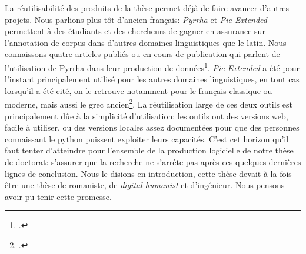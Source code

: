 La réutilisabilité des produits de la thèse permet déjà de faire avancer d'autres projets. Nous parlions plus tôt d'ancien français: \textit{Pyrrha} et \textit{Pie-Extended} permettent à des étudiants et des chercheurs de gagner en assurance sur l'annotation de corpus dans d'autres domaines linguistiques que le latin. Nous connaissons quatre articles publiés ou en cours de publication qui parlent de l'utilisation de Pyrrha dans leur production de données\footcite{ceresato_lanalisi_2021, meelen_old_2021,pyrrhachahan, camps:halshs-03353125}. \textit{Pie-Extended} a été pour l'instant principalement utilisé pour les autres domaines linguistiques, en tout cas lorsqu'il a été cité, on le retrouve notamment pour le français classique ou moderne, mais aussi le grec ancien\footcite{reboul:hal-03340641}. La réutilisation large de ces deux outils est principalement dûe à la simplicité d'utilisation: les outils ont des versions web, facile à utiliser, ou des versions locales assez documentées pour que des personnes connaissant le python puissent exploiter leurs capacités. C'est cet horizon qu'il faut tenter d'atteindre pour l'ensemble de la production logicielle de notre thèse de doctorat: s'assurer que la recherche ne s'arrête pas après ces quelques dernières lignes de conclusion. Nous le disions en introduction, cette thèse devait à la fois être une thèse de romaniste, de \textit{digital humanist} et d'ingénieur. Nous pensons avoir pu tenir cette promesse.
